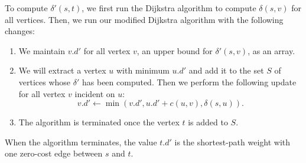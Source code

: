 \documentclass{article}
\begin{document}
To compute $\delta'(s, t)$, we first run the Dijkstra algorithm to compute $\delta(s, v)$ for all vertices. Then, we run our modified Dijkstra algorithm with the following changes:
\begin{enumerate}
    \item We maintain $v.d'$ for all vertex $v$, an upper bound for $\delta'(s, v)$, as an array.
    \item We will extract a vertex $u$ with minimum $u.d'$ and add it to the set $S$ of vertices whose $\delta'$ has been computed. Then we perform the following update for all vertex $v$ incident on $u$:
    \[
        v.d' \gets \min(v.d', u.d' + c(u, v), \delta(s, u)).
    \]
    \item The algorithm is terminated once the vertex $t$ is added to $S$.
\end{enumerate}

When the algorithm terminates, the value $t.d'$ is the shortest-path weight with one zero-cost edge between $s$ and $t$.
\end{document}
